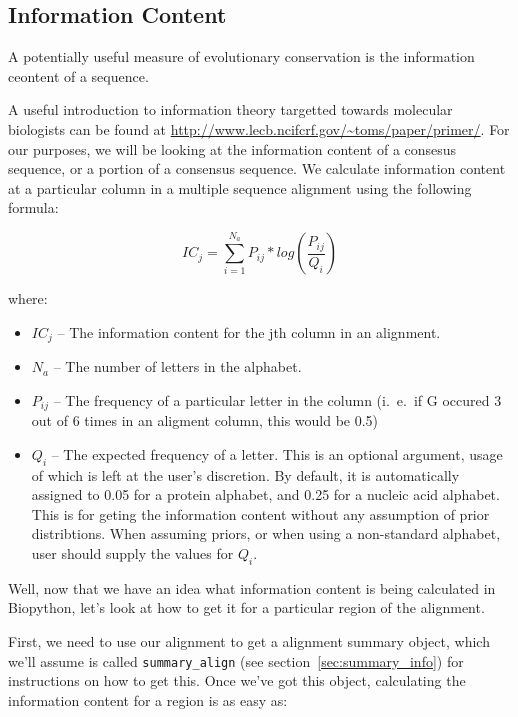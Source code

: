 \documentclass{report}
\begin{document}
\subsection{Information Content}
\label{sec:getting_info_content}

A potentially useful measure of evolutionary conservation is the information ceontent of a sequence.


A useful introduction to information theory targetted towards molecular biologists can be found at \url{http://www.lecb.ncifcrf.gov/~toms/paper/primer/}. For our purposes, we will be looking at the information content of a consesus sequence, or a portion of a consensus sequence. We calculate information content at a particular column in a multiple sequence alignment using the following formula:

\begin{displaymath}
IC_{j} = \sum_{i=1}^{N_{a}} P_{ij} * log(\frac{P_{ij}}{Q_{i}}) 
\end{displaymath}

where:

\begin{itemize}
  \item $IC_{j}$ -- The information content for the jth column in an alignment.
  \item $N_{a}$ -- The number of letters in the alphabet.
  \item $P_{ij}$ -- The frequency of a particular letter in the column (i.~e.~if G occured 3 out of 6 times in an aligment column, this would be 0.5)
  \item $Q_{i}$ --  The expected frequency of a letter. This is an
  optional argument, usage of which is left at the user's
  discretion. By default, it is automatically assigned to 0.05 for a
  protein alphabet, and 0.25 for a nucleic acid alphabet. This is for
  geting the information content without any assumption of prior
  distribtions. When assuming priors, or when using a non-standard
  alphabet, user should supply the values for $Q_{i}$. 
\end{itemize}

Well, now that we have an idea what information content is being calculated in Biopython, let's look at how to get it for a particular region of the alignment.


First, we need to use our alignment to get a alignment summary object, which we'll assume is called \verb|summary_align| (see section~\ref{sec:summary_info}) for instructions on how to get this. Once we've got this object, calculating the information content for a region is as easy as:
\end{document}
